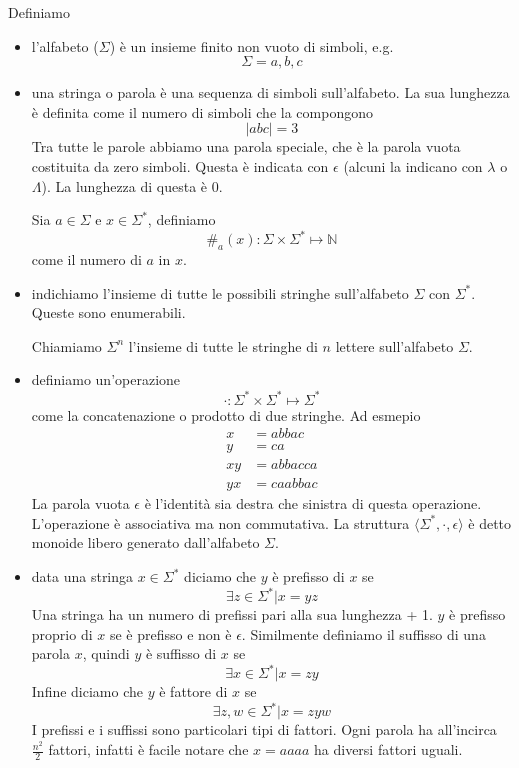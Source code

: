 \documentclass[12pt]{article}
\begin{document}
Definiamo
\begin{itemize}
	\item l'alfabeto ($\Sigma$) è un insieme finito non vuoto di simboli, e.g. 
		$$ \Sigma = { a , b , c } $$
	\item una stringa o parola è una sequenza di simboli sull'alfabeto.
		La sua lunghezza è definita come il numero di simboli che la compongono
		$$ | abc | = 3 $$
		Tra tutte le parole abbiamo una parola speciale, che è la parola vuota costituita da zero simboli.
		Questa è indicata con $\epsilon$ (alcuni la indicano con $\lambda$ o $\Lambda$).
		La lunghezza di questa è 0.

		Sia $a \in \Sigma$ e $x \in \Sigma^*$, definiamo 
		$$ \#_a(x) : \Sigma \times \Sigma^* \mapsto \mathbb{N} $$
		come il numero di $a$ in $x$.
	\item indichiamo l'insieme di tutte le possibili stringhe sull'alfabeto $\Sigma$ con $\Sigma^*$.
		Queste sono enumerabili.

		Chiamiamo $\Sigma^n$ l'insieme di tutte le stringhe di $n$ lettere sull'alfabeto $\Sigma$.
	\item definiamo un'operazione 
		$$ \cdot : \Sigma^* \times \Sigma^* \mapsto \Sigma^*$$
		come la concatenazione o prodotto di due stringhe.
		Ad esmepio 
		\begin{align*}
			x &= abbac \\
			y &= ca \\
			xy &= abbacca \\
			yx &= caabbac
		\end{align*}
		La parola vuota $\epsilon$ è l'identità sia destra che sinistra di questa operazione.
		L'operazione è associativa ma non commutativa.
		La struttura $\langle \Sigma^*, \cdot, \epsilon \rangle$ è detto monoide libero generato dall'alfabeto $\Sigma$.
	\item data una stringa $x \in \Sigma^*$ diciamo che $y$ è prefisso di $x$ se
		$$ \exists z \in \Sigma^* | x = yz $$
		Una stringa ha un numero di prefissi pari alla sua lunghezza + 1.
		$y$ è prefisso proprio di $x$ se è prefisso e non è $\epsilon$.
		Similmente definiamo il suffisso di una parola $x$, quindi $y$ è suffisso di $x$ se 
		$$ \exists x \in \Sigma^* | x = zy $$
		Infine diciamo che $y$ è fattore di $x$ se
		$$ \exists z, w \in \Sigma^* | x = zyw $$
		I prefissi e i suffissi sono particolari tipi di fattori.
		Ogni parola ha all'incirca $\frac{n^2}{2}$ fattori, infatti è facile notare che $x = aaaa$ ha diversi fattori uguali.


\end{itemize}
\end{document}
